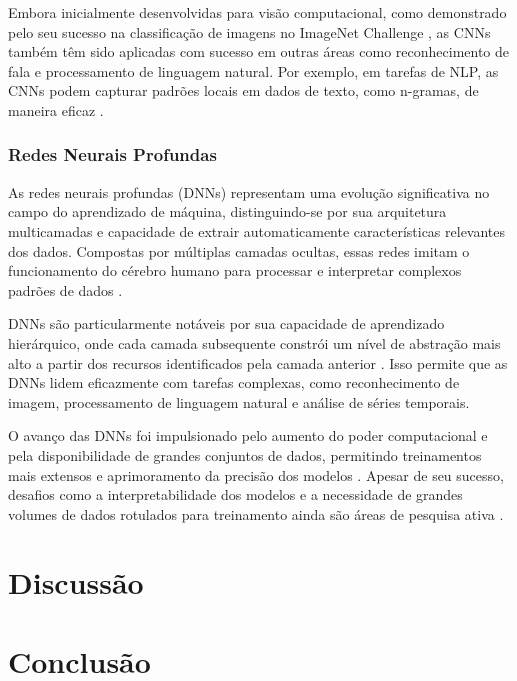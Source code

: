 \documentclass[conference]{IEEEtran}
\begin{document}
Embora inicialmente desenvolvidas para visão computacional, como demonstrado pelo seu sucesso na 
classificação de imagens no ImageNet Challenge \cite{Russakovsky2015}, as CNNs também têm sido aplicadas 
com sucesso em outras áreas como reconhecimento de fala e processamento de linguagem natural. 
Por exemplo, em tarefas de NLP, as CNNs podem capturar padrões locais em dados de texto, 
como n-gramas, de maneira eficaz \cite{Kim2014}.



\subsubsection{Redes Neurais Profundas} As redes neurais profundas (DNNs) representam uma evolução 
significativa no campo do aprendizado de máquina, distinguindo-se por sua arquitetura multicamadas 
e capacidade de extrair automaticamente características relevantes dos dados. 
Compostas por múltiplas camadas ocultas, essas redes imitam o funcionamento do cérebro humano para 
processar e interpretar complexos padrões de dados \cite{LeCun2015}.

DNNs são particularmente notáveis por sua capacidade de aprendizado hierárquico, 
onde cada camada subsequente constrói um nível de abstração mais alto a partir dos recursos 
identificados pela camada anterior \cite{Schmidhuber2015}. 
Isso permite que as DNNs lidem eficazmente com tarefas complexas, como reconhecimento de imagem, 
processamento de linguagem natural e análise de séries temporais.

O avanço das DNNs foi impulsionado pelo aumento do poder computacional e pela disponibilidade de grandes conjuntos de dados, 
permitindo treinamentos mais extensos e aprimoramento da precisão dos modelos \cite{Goodfellow2016}. 
Apesar de seu sucesso, desafios como a interpretabilidade dos modelos e 
a necessidade de grandes volumes de dados rotulados para treinamento 
ainda são áreas de pesquisa ativa \cite{Zhang2018}.

\section{Discussão}


\section{Conclusão}
\end{document}
